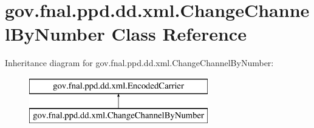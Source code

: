 \hypertarget{classgov_1_1fnal_1_1ppd_1_1dd_1_1xml_1_1ChangeChannelByNumber}{\section{gov.\-fnal.\-ppd.\-dd.\-xml.\-Change\-Channel\-By\-Number Class Reference}
\label{classgov_1_1fnal_1_1ppd_1_1dd_1_1xml_1_1ChangeChannelByNumber}
}
Inheritance diagram for gov.\-fnal.\-ppd.\-dd.\-xml.\-Change\-Channel\-By\-Number\-:\begin{figure}[H]
\begin{center}
\leavevmode
\includegraphics[height=2.000000cm]{classgov_1_1fnal_1_1ppd_1_1dd_1_1xml_1_1ChangeChannelByNumber}
\end{center}
\end{figure}

